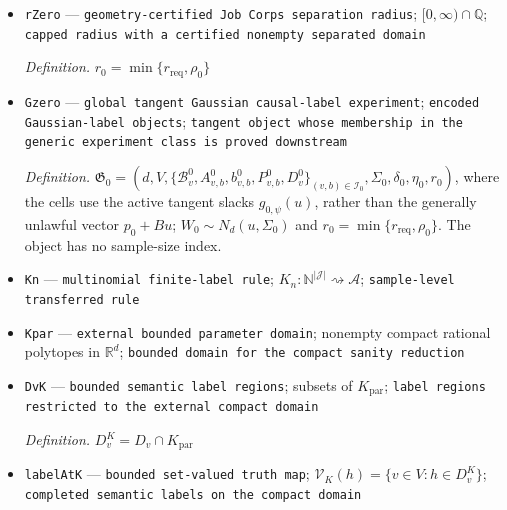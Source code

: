 \documentclass{article}
\begin{document}
\begin{itemize}
  \par\smallskip\noindent\emph{Definition.} For each rival component \(P_{v,b}^0=\{g:A_{v,b}^0g\le b_{v,b}^0\}\), choose the first row \(i\) with rational gap \(\gamma_{v,b,i}=(A_{v,b}^0u_*-b_{v,b}^0)_i>0\). Compute by rational bisection an upper bound \(s_{v,b,i}\ge\|(A_{v,b}^0)_{i\cdot}\|_{\Sigma_0}\), and set \(\rho_{v,b}=\gamma_{v,b,i}/s_{v,b,i}\). If no violated row exists, set \(\rho_{v,b}=0\). Define \(\rho_0=\min(\{1\}\cup\{\rho_{v,b}:v\ne v_*, (v,b)\in\mathcal I_0\})\).
  \item \texttt{rZero} --- \texttt{geometry-\allowbreak{}certified Job Corps separation radius}; \([0,\infty)\cap\mathbb Q\); \texttt{capped radius with a certified nonempty separated domain}
  \par\smallskip\noindent\emph{Definition.} \(r_0=\min\{r_{\mathrm{req}},\rho_0\}\)
  \item \texttt{Gzero} --- \texttt{global tangent Gaussian causal-\allowbreak{}label experiment}; \texttt{encoded Gaussian-\allowbreak{}label objects}; \texttt{tangent object whose membership in the generic experiment class is proved downstream}
  \par\smallskip\noindent\emph{Definition.} \(\mathfrak G_0=(d,V,\{\mathcal B_v^0,A_{v,b}^0,b_{v,b}^0,P_{v,b}^0,D_v^0\}_{(v,b)\in\mathcal I_0},\Sigma_0,\delta_0,\eta_0,r_0)\), where the cells use the active tangent slacks \(g_{0,\psi}(u)\), rather than the generally unlawful vector \(p_0+Bu\); \(W_0\sim N_d(u,\Sigma_0)\) and \(r_0=\min\{r_{\mathrm{req}},\rho_0\}\). The object has no sample-size index.
  \item \texttt{Kn} --- \texttt{multinomial finite-\allowbreak{}label rule}; \(K_n:\mathbb N^{|\mathcal J|}\rightsquigarrow\mathcal A\); \texttt{sample-\allowbreak{}level transferred rule}
  \item \texttt{Kpar} --- \texttt{external bounded parameter domain}; nonempty compact rational polytopes in \(\mathbb R^d\); \texttt{bounded domain for the compact sanity reduction}
  \item \texttt{DvK} --- \texttt{bounded semantic label regions}; subsets of \(K_{\mathrm{par}}\); \texttt{label regions restricted to the external compact domain}
  \par\smallskip\noindent\emph{Definition.} \(D_v^K=D_v\cap K_{\mathrm{par}}\)
  \item \texttt{labelAtK} --- \texttt{bounded set-\allowbreak{}valued truth map}; \(\mathcal V_K(h)=\{v\in V:h\in D_v^K\}\); \texttt{completed semantic labels on the compact domain}

\end{itemize}
\end{document}
